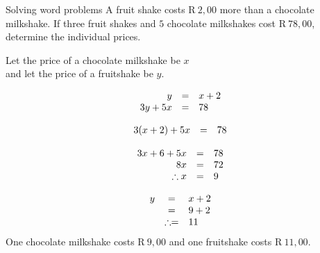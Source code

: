 \begin{wex}
{Solving word problems}
{
A fruit shake costs R$~2,00$ more than a chocolate milkshake. If three fruit shakes and $5$ chocolate milkshakes cost R$~78,00$, determine the individual prices.}

{
Let the price of a chocolate milkshake be $x$ 
\\ and let the price of a fruitshake be $y$.


\begin{equation*}
\begin{array}{ccl} \hfill y &=& x+2 \hfill \\
\hfill 3y+5x& =& 78\hfill 
\end{array}
\end{equation*}

\begin{equation*}
\begin{array}{ccl}\hfill 3(x+2)+5x& =& 78\hfill \\
\end{array}
\end{equation*}

\begin{equation*}
\begin{array}{ccl}
 \hfill 3x+6+5x& =& 78\hfill \\ 
\hfill 8x& =& 72\hfill \\ 
\hfill \therefore x& =& 9\hfill \\  \end{array}
\end{equation*}

\begin{equation*}
\begin{array}{ccl}
\hfill y& =& x+2\hfill \\
 \hfill & =& 9+2\hfill \\ 
\hfill & \therefore =& 11\hfill  \end{array}
\end{equation*}
One chocolate milkshake costs R$~9,00$ and one fruitshake costs R$~ 11,00$.
}
\end{wex}

